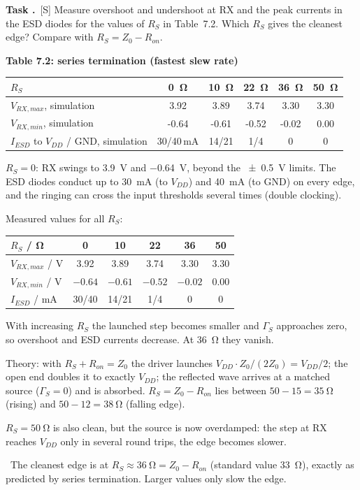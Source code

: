 \documentclass[a4paper,11pt]{article}
\newcounter{task}[section]
\renewcommand{\thetask}{\thesection.\arabic{task}}
\newcommand{\task}[1]{\par\medskip\refstepcounter{task}%
  {\sffamily\bfseries\color{rwuviolet}Task \thetask}\ {\sffamily\small\color{rwucyandark}[#1]}\quad}
\newenvironment{solution}{\begin{solbox}}{\end{solbox}}
\newcommand{\answer}{\par\smallskip{\sffamily\bfseries\color{rwuviolet}Answer:}\ }
\newcommand{\simv}[1]{\textcolor{rwuviolet}{#1}}
\newcommand{\simv}[1]{}
\newenvironment{results}[2]{\par\smallskip\begin{center}\small\sffamily
  {\color{rwucyandark}\bfseries #1}\\[1mm]\renewcommand{\arraystretch}{1.25}\begin{tabular}{#2}\toprule}
  {\bottomrule\end{tabular}\end{center}}
\begin{document}
\task{S} Measure overshoot and undershoot at RX and the peak currents in the ESD diodes for the values of $R_S$ in
Table~7.2. Which $R_S$ gives the cleanest edge? Compare with $R_S=Z_0-R_{on}$.

\begin{results}{Table 7.2: series termination (fastest slew rate)}{lccccc}
  $R_S$ & \SI{0}{\ohm} & \SI{10}{\ohm} & \SI{22}{\ohm} & \SI{36}{\ohm} & \SI{50}{\ohm}\\ \midrule
  $V_{RX,max}$, simulation & \simv{3.92} & \simv{3.89} & \simv{3.74} & \simv{3.30} & \simv{3.30}\\
  $V_{RX,min}$, simulation & \simv{-0.64} & \simv{-0.61} & \simv{-0.52} & \simv{-0.02} & \simv{0.00}\\
  $I_{ESD}$ to $V_{DD}$ / GND, simulation & \simv{30/40\,mA} & \simv{14/21} & \simv{1/4} & \simv{0} & \simv{0}\\
\end{results}

\begin{solution}
\begin{steps}
  \item $R_S=0$: RX swings to \SI{3.9}{V} and \SI{-0.64}{V}, beyond the \SI{\pm0.5}{V} limits. The ESD diodes
        conduct up to \SI{30}{mA} (to $V_{DD}$) and \SI{40}{mA} (to GND) on every edge, and the ringing can cross
        the input thresholds several times (double clocking).
  \item Measured values for all $R_S$:\\[1mm]
\begin{tabular}{lccccc}
  \toprule
  $R_S$ / \si{\ohm} & 0 & 10 & 22 & 36 & 50\\
  \midrule
  $V_{RX,max}$ / V & 3.92 & 3.89 & 3.74 & 3.30 & 3.30\\
  $V_{RX,min}$ / V & $-0.64$ & $-0.61$ & $-0.52$ & $-0.02$ & 0.00\\
  $I_{ESD}$ / mA & 30/40 & 14/21 & 1/4 & 0 & 0\\
  \bottomrule
\end{tabular}
  \item With increasing $R_S$ the launched step becomes smaller and $\Gamma_S$ approaches zero, so overshoot and
        ESD currents decrease. At \SI{36}{\ohm} they vanish.
  \item Theory: with $R_S+R_{on}=Z_0$ the driver launches $V_{DD}\cdot Z_0/(2Z_0)=V_{DD}/2$; the open end doubles
        it to exactly $V_{DD}$; the reflected wave arrives at a matched source ($\Gamma_S=0$) and is absorbed.
        $R_S=Z_0-R_{on}$ lies between $50-15=\SI{35}{\ohm}$ (rising) and $50-12=\SI{38}{\ohm}$ (falling edge).
  \item $R_S=\SI{50}{\ohm}$ is also clean, but the source is now overdamped: the step at RX reaches $V_{DD}$ only
        in several round trips, the edge becomes slower.
\end{steps}
\answer The cleanest edge is at $R_S\approx\SI{36}{\ohm}=Z_0-R_{on}$ (standard value \SI{33}{\ohm}), exactly as
predicted by series termination. Larger values only slow the edge.
\end{solution}
\end{document}
